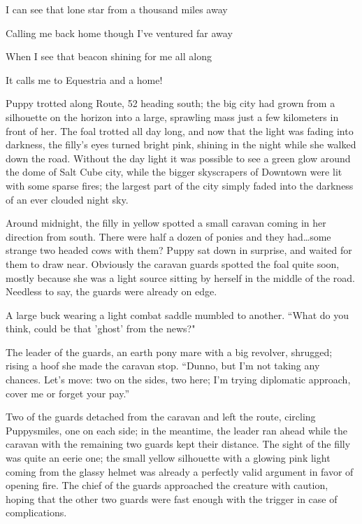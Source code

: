 \begin{song}
I can see that lone star from a thousand miles away

Calling me back home though I've ventured far away

When I see that beacon shining for me all along

It calls me to Equestria and a home!
\end{song}

\horizonline


Puppy trotted along Route, 52 heading south; the big city had grown from a silhouette on the horizon into a large, sprawling mass just a few kilometers in front of her. The foal trotted all day long, and now that the light was fading into darkness, the filly's eyes turned bright pink, shining in the night while she walked down the road. Without the day light it was possible to see a green glow around the dome of Salt Cube city, while the bigger skyscrapers of Downtown were lit with some sparse fires; the largest part of the city simply faded into the darkness of an ever clouded night sky.

Around midnight, the filly in yellow spotted a small caravan coming in her direction from south. There were half a dozen of ponies and they had\dots some strange two headed cows with them? Puppy sat down in surprise, and waited for them to draw near. Obviously the caravan guards spotted the foal quite soon, mostly because she was a light source sitting by herself in the middle of the road. Needless to say, the guards were already on edge.

A large buck wearing a light combat saddle mumbled to another. ``What do you think, could be that 'ghost' from the news?"

The leader of the guards, an earth pony mare with a big revolver, shrugged; rising a hoof she made the caravan stop. ``Dunno, but I'm not taking any chances. Let's move: two on the sides, two here; I'm trying diplomatic approach, cover me or forget your pay.''

Two of the guards detached from the caravan and left the route, circling Puppysmiles, one on each side; in the meantime, the leader ran ahead while the caravan with the remaining two guards kept their distance. The sight of the filly was quite an eerie one; the small yellow silhouette with a glowing pink light coming from the glassy helmet was already a perfectly valid argument in favor of opening fire. The chief of the guards approached the creature with caution, hoping that the other two guards were fast enough with the trigger in case of complications.

